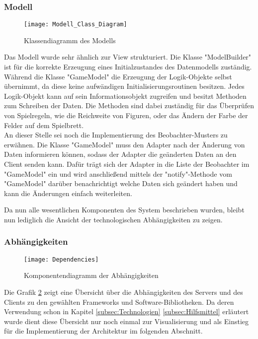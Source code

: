 \subsubsection{Modell}
\begin{figure}[htp]
	\centering
	\captionsetup{justification=centering}
	\texttt{[image: Modell\_Class\_Diagram]}
	\caption[Modell]{Klassendiagramm des Modells}
	\label{fig:ClassesModell}
\end{figure}

\noindent Das Modell wurde sehr ähnlich zur View strukturiert. Die Klasse "ModelBuilder" ist für die korrekte Erzeugung eines Initialzustandes des Datenmodells zuständig. Während die Klasse "GameModel" die Erzeugung der Logik-Objekte selbst übernimmt, da diese keine aufwändigen Initialisierungsroutinen besitzen. Jedes Logik-Objekt kann auf sein Informationsobjekt zugreifen und besitzt Methoden zum Schreiben der Daten. Die Methoden sind dabei zuständig für das Überprüfen von Spielregeln, wie die Reichweite von Figuren, oder das Ändern der Farbe der Felder auf dem Spielbrett.\\
An dieser Stelle sei noch die Implementierung des Beobachter-Musters zu erwähnen. Die Klasse "GameModel" muss den Adapter nach der Änderung von Daten informieren können, sodass der Adapter die geänderten Daten an den Client senden kann. Dafür trägt sich der Adapter in die Liste der Beobachter im "GameModel" ein und wird anschließend mittels der "notify"-Methode vom "GameModel" darüber benachrichtigt welche Daten sich geändert haben und kann die Änderungen einfach weiterleiten.

Da nun alle wesentlichen Komponenten des System beschrieben wurden, bleibt nun lediglich die Ansicht der technologischen Abhängigkeiten zu zeigen.

\subsubsection{Abhängigkeiten}
\begin{figure}[htp]
	\centering
	\captionsetup{justification=centering}
	\texttt{[image: Dependencies]}
	\caption[Abhängigkeiten]{Komponentendiagramm der Abhängigkeiten}
	\label{fig:ComponentDependencies}
\end{figure}
\noindent Die Grafik \ref{fig:ComponentDependencies} zeigt eine Übersicht über die Abhängigkeiten des Servers und des Clients zu den gewählten Frameworks und Software-Bibliotheken. Da deren Verwendung schon in Kapitel \ref{subsec:Technologien} \bzw \ref{subsec:Hilfsmittel} erläutert wurde dient diese Übersicht nur noch einmal zur Visualisierung und als Einstieg für die Implementierung der Architektur im folgenden Abschnitt.
